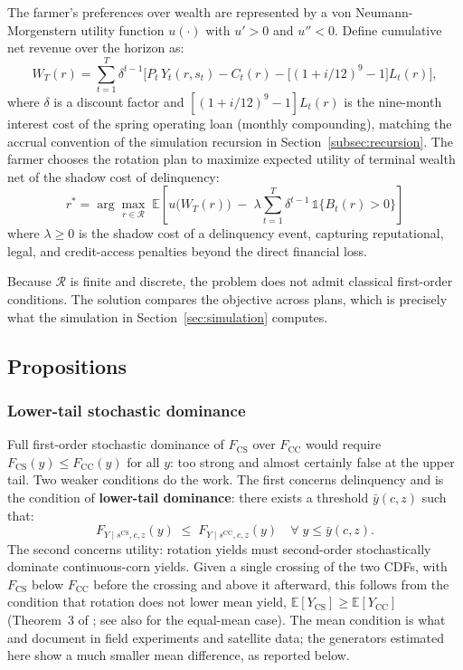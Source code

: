 \documentclass[11pt,letterpaper]{article}
\theoremstyle{remark}
\begin{document}
The farmer's preferences over wealth are represented by a von Neumann-Morgenstern utility function $u(\cdot)$ with $u' > 0$ and $u'' < 0$. Define cumulative net revenue over the horizon as:
\begin{equation}
W_T(r) = \sum_{t=1}^{T} \delta^{t-1}\bigl[P_t\,Y_t(r, s_t) - C_t(r) - \bigl[(1+i/12)^{9}-1\bigr] L_t(r)\bigr],
\end{equation}
where $\delta$ is a discount factor and $[(1+i/12)^{9}-1]L_t(r)$ is the nine-month interest cost of the spring operating loan (monthly compounding), matching the accrual convention of the simulation recursion in Section~\ref{subsec:recursion}. The farmer chooses the rotation plan to maximize expected utility of terminal wealth net of the shadow cost of delinquency:
\begin{equation}
r^{*} = \arg\max_{r \in \mathcal{R}}\;\mathbb{E}\!\left[u\!\bigl(W_T(r)\bigr)\;-\;\lambda \sum_{t=1}^{T} \delta^{t-1}\,\mathbb{1}\{B_t(r)>0\}\right]
\end{equation}
where $\lambda \geq 0$ is the shadow cost of a delinquency event, capturing reputational, legal, and credit-access penalties beyond the direct financial loss.
 
Because $\mathcal{R}$ is finite and discrete, the problem does not admit classical first-order conditions. The solution compares the objective across plans, which is precisely what the simulation in Section~\ref{sec:simulation} computes.
 
\subsection{\label{subsec:propositions}Propositions}
 
\subsubsection{\label{subsubsec:proposition_1}Lower-tail stochastic dominance}
 
Full first-order stochastic dominance of $F_{\text{CS}}$ over $F_{\text{CC}}$ would require $F_{\text{CS}}(y) \leq F_{\text{CC}}(y)$ for all $y$: too strong and almost certainly false at the upper tail. Two weaker conditions do the work. The first concerns delinquency and is the condition of \textbf{lower-tail dominance}: there exists a threshold $\bar{y}(c,z)$ such that:
\begin{equation}
F_{Y \mid s^{\text{CS}}, c, z}(y)\;\leq\;F_{Y \mid s^{\text{CC}}, c, z}(y)\quad \forall\; y \leq \bar{y}(c,z). \tag{LTD}
\end{equation}
The second concerns utility: rotation yields must second-order stochastically dominate continuous-corn yields. Given a single crossing of the two CDFs, with $F_{\text{CS}}$ below $F_{\text{CC}}$ before the crossing and above it afterward, this follows from the condition that rotation does not lower mean yield, $\mathbb{E}[Y_{\text{CS}}] \geq \mathbb{E}[Y_{\text{CC}}]$ (Theorem~3 of \citealt{Hanoch1969}; see also \citealt{Rothschild1970} for the equal-mean case). The mean condition is what \citet{Bullock1992} and \citet{Seifert2017} document in field experiments and satellite data; the generators estimated here show a much smaller mean difference, as reported below.
\end{document}
